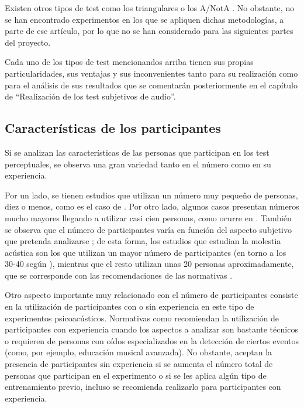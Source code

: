 \documentclass[11pt,a4paper]{book}
\begin{document}
    		Existen otros tipos de test como los triangulares o los A/NotA \cite{delaPrida2021, Brockhoff2009}. No obstante, no se han encontrado experimentos en los que se apliquen dichas metodologías, a parte de ese artículo, por lo que no se han considerado para las siguientes partes del proyecto.
    
    		Cada uno de los tipos de test mencionandos arriba tienen sus propias particularidades, sus ventajas y sus inconvenientes tanto para su realización como para el análisis de sus resultados que se comentarán posteriormente en el capítulo de ``Realización de los test subjetivos de audio''.
    
	    \subsection{Características de los participantes}
    		Si se analizan las características de las personas que participan en los test perceptuales, se observa una gran variedad tanto en el número como en su experiencia. 
    		
    		Por un lado, se tienen estudios que utilizan un número muy pequeño de personas, diez o menos, como es el caso de \cite{2019MNowak, 2002PZahorik, 2016SKlockgether,2019ZShao}. Por otro lado, algunos casos presentan números mucho mayores llegando a utilizar casi cien personas, como ocurre en \cite{1954JEgan}. También se observa que el número de participantes varía en función del aspecto subjetivo que pretenda analizarse \cite{Tejada2020}; de esta forma, los estudios que estudian la molestia acústica son los que utilizan un mayor número de participantes (en torno a los 30-40 según \cite{Tejada2020}), mientras que el resto utilizan unas 20 personas aproximadamente, que se corresponde con las recomendaciones de las normativas \cite{UIT1116, UIT1284, UIT1534}.

            Otro aspecto importante muy relacionado con el número de participantes consiste en la utilización de participantes con o sin experiencia en este tipo de experimentos psicoacústicos. Normativas como \cite{UIT1116, UIT1284, UIT1534} recomiendan la utilización de participantes con experiencia cuando los aspectos a analizar son bastante técnicos o requieren de personas con oídos especializados en la detección de ciertos eventos (como, por ejemplo, educación musical avanzada). No obstante, aceptan la presencia de participantes sin experiencia si se aumenta el número total de personas que participan en el experimento o si se les aplica algún tipo de entrenamiento previo, incluso se recomienda realizarlo para participantes con experiencia.
\end{document}
